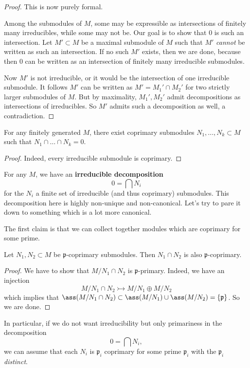 \begin{proof} This is now purely formal. 

Among the submodules of $M$, some may be expressible as intersections of
finitely many irreducibles, while some may not be. Our goal is to show that
$0$ is such an intersection.
Let $M' \subset M$ be a maximal submodule of $M$ such that $M'$ \emph{cannot} be
written as such an intersection. If no such
$M'$ exists, then we are done, because then $0$ can be written as an
intersection of finitely many irreducible submodules.

Now $M'$ is not irreducible, or it would be the intersection of one irreducible
submodule.
It follows $M'$ can be written as $M'=M_1' \cap M_2'$ for two strictly
larger submodules of $M$.  But by maximality, $M_1', M_2'$ admit decompositions as
intersections of irreducibles. So $M'$ admits such a decomposition as well, a contradiction. 
\end{proof} 

\begin{corollary} 
For any finitely generated $M$, there exist coprimary submodules $N_1, \dots,
N_k \subset M$ such that $N_1 \cap \dots \cap N_k  = 0$.
\end{corollary} 
\begin{proof} 
Indeed, every irreducible submodule is coprimary.
\end{proof} 


For any $M$, we have an \textbf{irreducible decomposition}
\[ 0 = \bigcap N_i  \]
for the $N_i$ a finite set of irreducible (and thus coprimary) submodules. 
This decomposition here is highly non-unique and non-canonical. Let's try to
pare it down to something which is a lot more canonical.

The first claim is that we can collect together modules which are coprimary for
some prime. 
\begin{lemma} 
Let $N_1, N_2 \subset M$ be $\mathfrak{p}$-coprimary submodules. Then $N_1 \cap
N_2$ is also $\mathfrak{p}$-coprimary.
\end{lemma} 
\begin{proof} 
We have to show that $M/N_1 \cap N_2$ is $\mathfrak{p}$-primary. Indeed, we have an injection
\[ M/N_1 \cap N_2 \rightarrowtail  M/N_1 \oplus M/N_2  \]
which implies that $\ass(M/N_1 \cap N_2) \subset \ass(M/N_1) \cup \ass(M/N_2) =
\left\{\mathfrak{p}\right\}$. So we are done. 
\end{proof} 

In particular, if we do not want irreducibility but only primariness in the
decomposition
\[ 0 = \bigcap N_i,  \]
we can assume that each $N_i$ is $\mathfrak{p}_i$ coprimary for some
 prime
$\mathfrak{p}_i$ with the $\mathfrak{p}_i$ \emph{distinct}.

